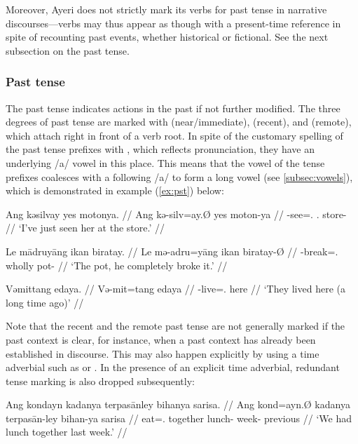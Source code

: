 Moreover, Ayeri does not strictly mark its verbs for past tense in narrative 
discourses---verbs may thus appear as though with a present-time reference in 
spite of recounting past events, whether historical or fictional. See the next 
subsection on the past tense.


\subsubsection{Past tense}
\label{subsubsec:past}
The past tense indicates actions in the past if not further modified. The three
degrees of past tense are marked with  (near/immediate),
 (recent), and  (remote), which attach right in
front of a verb root. In spite of the customary spelling of the past tense
prefixes with , which reflects pronunciation, they have an underlying
/a/ vowel in this place. This means that the vowel of the tense prefixes
coalesces with a following /a/ to form a long vowel (see
\autoref{subsec:vowels}), which is demonstrated in example (\ref{ex:pst})
below:

\pex
\a\label{ex:npst}\begingl
	\gla Ang kəsilvay yes motonya. //
	\glb Ang kə-silv=ay.Ø yes moton-ya //
	\glc \AgtT{} \NPst{}-see=\Fsg{}.\Top{} \TsgF{}.\Parg{} store-\Loc{} //
	\glft `I've just seen her at the store.' //
\endgl

\a\label{ex:pst}\begingl
	\gla Le mādruyāng ikan biratay. //
	\glb Le mə-adru=yāng ikan biratay-Ø //
	\glc \PatTI{} \Pst{}-break=\TsgM{}.\Aarg{} wholly pot-\Top{} //
	\glft `The pot, he completely broke it.' //
\endgl

\a\label{ex:rpst}\begingl
	\gla Vəmittang edaya. //
	\glb Və-mit=tang edaya //
	\glc \RPst{}-live=\TplM{}.\Aarg{} here //
	\glft `They lived here (a long time ago)' //
\endgl

\xe

Note that the recent and the remote past tense are not generally marked if the 
past context is clear, for instance, when a past context has already been 
established in discourse. This may also happen explicitly by using a time 
adverbial such as  or . In the presence of an 
explicit time adverbial, redundant tense marking is also dropped subsequently:

\ex\begingl
	\gla Ang kondayn kadanya terpasānley bihanya sarisa. //
	\glb Ang kond=ayn.Ø kadanya terpasān-ley bihan-ya sarisa //
	\glc \AgtT{} eat=\Fpl{}.\Top{} together lunch-\PargI{} week-\Loc{}
		previous //
	\glft `We had lunch together last week.' //
\endgl\xe

